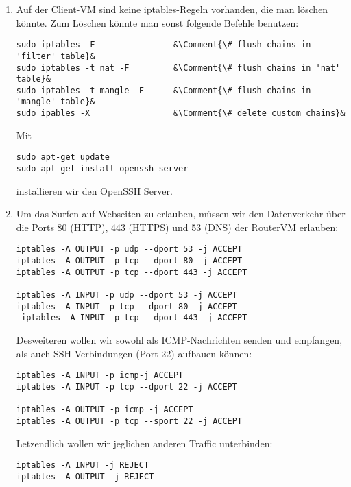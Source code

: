 \documentclass{scrartcl}
\begin{document}
    \begin{enumerate}[\bfseries 1.]
        \item Auf der Client-VM sind keine iptables-Regeln vorhanden, die man
              löschen könnte. Zum Löschen könnte man sonst folgende Befehle benutzen:

              \begin{lstlisting}[style=BashInputStyle]
sudo iptables -F                &\Comment{\# flush chains in 'filter' table}&
sudo iptables -t nat -F         &\Comment{\# flush chains in 'nat' table}&
sudo iptables -t mangle -F      &\Comment{\# flush chains in 'mangle' table}&
sudo ipables -X                 &\Comment{\# delete custom chains}&
              \end{lstlisting}

              Mit
              \begin{lstlisting}[style=BashInputStyle]
sudo apt-get update
sudo apt-get install openssh-server
              \end{lstlisting}
              installieren wir den OpenSSH Server.

        \item  Um das Surfen auf Webseiten zu erlauben, müssen wir den Datenverkehr über
               die Ports 80 (HTTP), 443 (HTTPS) und 53 (DNS) der RouterVM erlauben:
               \begin{lstlisting}
iptables -A OUTPUT -p udp --dport 53 -j ACCEPT
iptables -A OUTPUT -p tcp --dport 80 -j ACCEPT
iptables -A OUTPUT -p tcp --dport 443 -j ACCEPT

iptables -A INPUT -p udp --dport 53 -j ACCEPT
iptables -A INPUT -p tcp --dport 80 -j ACCEPT
 iptables -A INPUT -p tcp --dport 443 -j ACCEPT
               \end{lstlisting}
               Desweiteren wollen wir sowohl als ICMP-Nachrichten senden und
               empfangen, als auch SSH-Verbindungen (Port 22) aufbauen können:
               \begin{lstlisting}
iptables -A INPUT -p icmp-j ACCEPT
iptables -A INPUT -p tcp --dport 22 -j ACCEPT

iptables -A OUTPUT -p icmp -j ACCEPT
iptables -A OUTPUT -p tcp --sport 22 -j ACCEPT
               \end{lstlisting}
               Letzendlich wollen wir jeglichen anderen Traffic unterbinden:
               \begin{lstlisting}
iptables -A INPUT -j REJECT
iptables -A OUTPUT -j REJECT
               \end{lstlisting}


\end{enumerate}
\end{document}
